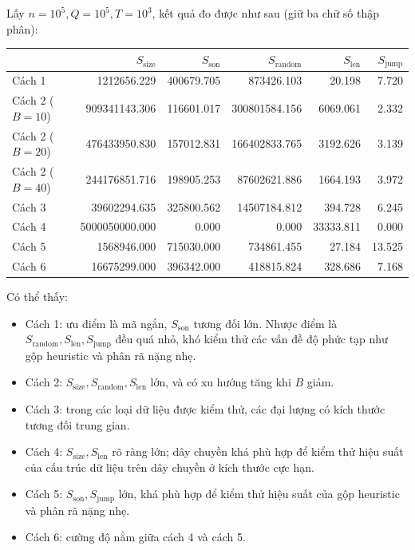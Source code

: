 \documentclass[11pt]{article}
\begin{document}
Lấy $n=10^5,Q=10^5,T=10^3$, kết quả đo được như sau (giữ ba chữ số thập phân):

\begin{center}
\scriptsize
\begin{tabular}{lrrrrr}
& $S_{\mathrm{size}}$ & $S_{\mathrm{son}}$ & $S_{\mathrm{random}}$ &
$S_{\mathrm{len}}$ & $S_{\mathrm{jump}}$ \\
\hline
Cách 1 & 1212656.229 & 400679.705 & 873426.103 & 20.198 & 7.720 \\
Cách 2 ($B=10$) & 909341143.306 & 116601.017 & 300801584.156 & 6069.061 & 2.332 \\
Cách 2 ($B=20$) & 476433950.830 & 157012.831 & 166402833.765 & 3192.626 & 3.139 \\
Cách 2 ($B=40$) & 244176851.716 & 198905.253 & 87602621.886 & 1664.193 & 3.972 \\
Cách 3 & 39602294.635 & 325800.562 & 14507184.812 & 394.728 & 6.245 \\
Cách 4 & 5000050000.000 & 0.000 & 0.000 & 33333.811 & 0.000 \\
Cách 5 & 1568946.000 & 715030.000 & 734861.455 & 27.184 & 13.525 \\
Cách 6 & 16675299.000 & 396342.000 & 418815.824 & 328.686 & 7.168
\end{tabular}
\end{center}

Có thể thấy:

\begin{itemize}
  \item Cách 1: ưu điểm là mã ngắn, $S_{\mathrm{son}}$ tương đối lớn. Nhược
  điểm là $S_{\mathrm{random}},S_{\mathrm{len}},S_{\mathrm{jump}}$ đều quá nhỏ,
  khó kiểm thử các vấn đề độ phức tạp như gộp heuristic và phân rã nặng nhẹ.
  \item Cách 2: $S_{\mathrm{size}},S_{\mathrm{random}},S_{\mathrm{len}}$ lớn,
  và có xu hướng tăng khi $B$ giảm.
  \item Cách 3: trong các loại dữ liệu được kiểm thử, các đại lượng có kích
  thước tương đối trung gian.
  \item Cách 4: $S_{\mathrm{size}},S_{\mathrm{len}}$ rõ ràng lớn; dây chuyền
  khá phù hợp để kiểm thử hiệu suất của cấu trúc dữ liệu trên dây chuyền ở kích
  thước cực hạn.
  \item Cách 5: $S_{\mathrm{son}},S_{\mathrm{jump}}$ lớn, khá phù hợp để kiểm
  thử hiệu suất của gộp heuristic và phân rã nặng nhẹ.
  \item Cách 6: cường độ nằm giữa cách 4 và cách 5.
\end{itemize}
\end{document}
